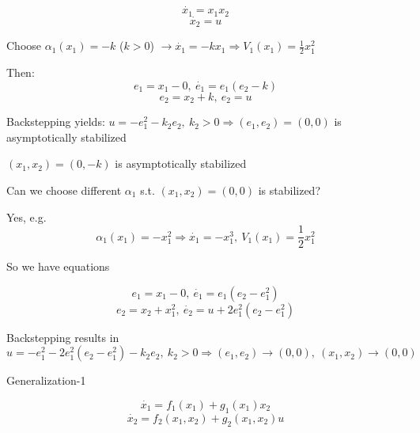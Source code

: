 \begin{Example}
\begin{equation*}
\dot{x_1} = x_1x_2
\end{equation*}
\begin{equation*}
\dot{x_2} = u
\end{equation*}

Choose $\alpha_1(x_1) = -k$ ($k > 0$) $\rightarrow \dot{x_1} = -k x_1 \Rightarrow V_1(x_1) = \frac{1}{2}x_1^2$

Then: 
\begin{equation*}
e_1 = x_1 - 0, \ \dot{e_1} = e_1(e_2 - k)
\end{equation*}
\begin{equation*}
e_2 = x_2 + k, \ e_2 = u
\end{equation*}

Backstepping yields: $u = - e_1^2 - k_2e_2, \ k_2 > 0 \Rightarrow (e_1,e_2) = (0,0)$ is asymptotically stabilized

$(x_1, x_2) = (0,-k)$ is asymptotically stabilized

Can we choose different $\alpha_1$ s.t. $(x_1, x_2) = (0,0)$ is stabilized?

Yes, e.g.
\begin{equation*}
\alpha_1(x_1) = -x_1^2 \Rightarrow \dot{x_1} = - x_1^3, \ V_1(x_1) = \frac{1}{2}x_1^2
\end{equation*}

So we have equations

\begin{equation*}
e_1 = x_1 - 0, \ \dot{e_1}  = e_1(e_2 - e_1^2) 
\end{equation*}
\begin{equation*}
e_2 = x_2 + x_1^2, \ \dot{e_2} = u + 2e_1^2(e_2 - e_1^2)
\end{equation*}

Backstepping results in 
\begin{equation*}
u = -e_1^2 - 2e_1^2(e_2 - e_1^2) - k_2e_2, \ k_2 > 0 \Rightarrow (e_1,e_2) \to (0,0), \ (x_1, x_2) \to (0,0)
\end{equation*}
\end{Example}

Generalization-1

\begin{equation*}
\dot{x_1} = f_1(x_1) + g_1(x_1)x_2
\end{equation*}
\begin{equation*}
\dot{x_2} = f_2(x_1, x_2) + g_2(x_1,x_2)u
\end{equation*}

